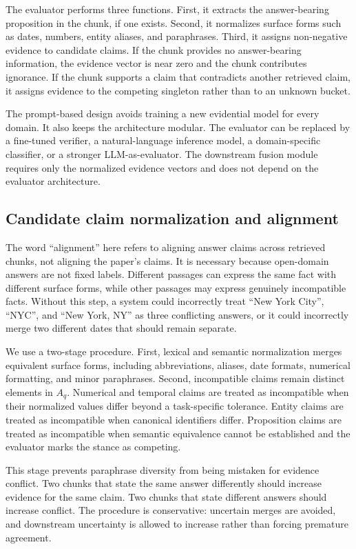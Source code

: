 \documentclass[preprint,12pt,authoryear,nopreprintline]{elsarticle}
\begin{document}
The evaluator performs three functions. First, it extracts the answer-bearing proposition in the chunk, if one exists. Second, it normalizes surface forms such as dates, numbers, entity aliases, and paraphrases. Third, it assigns non-negative evidence to candidate claims. If the chunk provides no answer-bearing information, the evidence vector is near zero and the chunk contributes ignorance. If the chunk supports a claim that contradicts another retrieved claim, it assigns evidence to the competing singleton rather than to an unknown bucket.

The prompt-based design avoids training a new evidential model for every domain. It also keeps the architecture modular. The evaluator can be replaced by a fine-tuned verifier, a natural-language inference model, a domain-specific classifier, or a stronger LLM-as-evaluator. The downstream fusion module requires only the normalized evidence vectors and does not depend on the evaluator architecture.

\subsection{Candidate claim normalization and alignment}

The word ``alignment'' here refers to aligning answer claims across retrieved chunks, not aligning the paper's claims. It is necessary because open-domain answers are not fixed labels. Different passages can express the same fact with different surface forms, while other passages may express genuinely incompatible facts. Without this step, a system could incorrectly treat ``New York City'', ``NYC'', and ``New York, NY'' as three conflicting answers, or it could incorrectly merge two different dates that should remain separate.

We use a two-stage procedure. First, lexical and semantic normalization merges equivalent surface forms, including abbreviations, aliases, date formats, numerical formatting, and minor paraphrases. Second, incompatible claims remain distinct elements in $A_q$. Numerical and temporal claims are treated as incompatible when their normalized values differ beyond a task-specific tolerance. Entity claims are treated as incompatible when canonical identifiers differ. Proposition claims are treated as incompatible when semantic equivalence cannot be established and the evaluator marks the stance as competing.

This stage prevents paraphrase diversity from being mistaken for evidence conflict. Two chunks that state the same answer differently should increase evidence for the same claim. Two chunks that state different answers should increase conflict. The procedure is conservative: uncertain merges are avoided, and downstream uncertainty is allowed to increase rather than forcing premature agreement.
\end{document}
